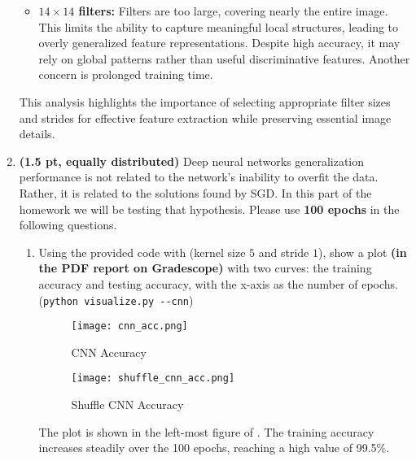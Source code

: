 \begin{enumerate}
\begin{itemize}
    \item \textbf{$14\times 14$ filters:} Filters are too large, covering 
    nearly the entire image. This limits the ability to capture meaningful 
    local structures, leading to overly generalized feature representations. 
    Despite high accuracy, it may rely on global patterns rather than useful 
    discriminative features. Another concern is prolonged training time.
\end{itemize}

This analysis highlights the importance of selecting appropriate filter sizes 
and strides for effective feature extraction while preserving essential image details.


\item {\bf (1.5 pt, equally distributed)} Deep neural networks generalization performance is not related to the network's inability to overfit the data. Rather, it is related to the solutions found by SGD. 
In this part of the homework we will be testing that hypothesis.
Please use {\bf 100 epochs} in the following questions.
\begin{enumerate}
\item Using the provided code with (kernel size $5$ and stride $1$), show a plot {\bf (in the PDF report on Gradescope)} with two curves: the training accuracy  and testing accuracy, with the x-axis as the number of epochs.  \\(\verb|python visualize.py --cnn|)

\begin{figure}[h!]
    \centering
    \begin{minipage}[b]{\textwidth}
        \centering
        \texttt{[image: cnn\_acc.png]}
        \caption{CNN Accuracy}
        \label{fig:cnn_acc}
    \end{minipage}
    \hspace{0.05\textwidth}
    \begin{minipage}[b]{0.4\textwidth}
        \centering
        \texttt{[image: shuffle\_cnn\_acc.png]}
        \caption{Shuffle CNN Accuracy}
        \label{fig:shuffle_cnn_acc}
    \end{minipage}
\end{figure}

The plot is shown in the left-most figure of . The training
accuracy increases steadily over the 100 epochs, reaching a high value of
99.5\%.


\end{enumerate}
\end{enumerate}

